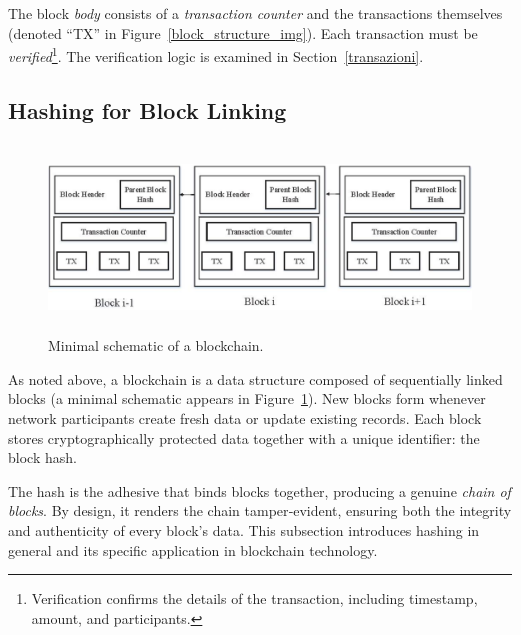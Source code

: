 The block \textit{body} consists of a \textit{transaction counter} and the transactions themselves (denoted “TX” in Figure~\ref{block_structure_img}). Each transaction must be \textit{verified}\footnote{Verification confirms the details of the transaction, including timestamp, amount, and participants.}. The verification logic is examined in Section~\ref{transazioni}.

\subsection{Hashing for Block Linking}\label{hashing}
\begin{figure}[h]
    \centering
    \includegraphics[width=12.5cm,height=5cm]{Images/Chap1/Chain.png}
    \caption[Minimal schematic of a blockchain]{Minimal schematic of a blockchain.}
    \label{chain_img}
\end{figure}
As noted above, a blockchain is a data structure composed of sequentially linked blocks (a minimal schematic appears in Figure~\ref{chain_img}). New blocks form whenever network participants create fresh data or update existing records. Each block stores cryptographically protected data together with a unique identifier: the block hash.

The hash is the adhesive that binds blocks together, producing a genuine \textit{chain of blocks}. By design, it renders the chain tamper‑evident, ensuring both the integrity and authenticity of every block's data. This subsection introduces hashing in general and its specific application in blockchain technology.

